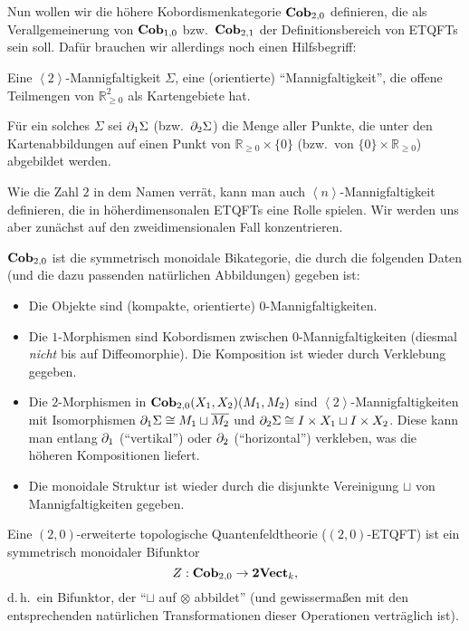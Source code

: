 
Nun wollen wir die h\"ohere Kobordismenkategorie $\mathbf{Cob}_{2, 0}$
definieren, die als Verallgemeinerung von $\mathbf{Cob}_{1, 0}$ bzw.\
$\mathbf{Cob}_{2, 1}$ der Definitionsbereich von ETQFTs sein soll. Daf\"ur
brauchen wir allerdings noch einen Hilfsbegriff:

\begin{Def}
Eine $\left<2\right>$-Mannigfaltigkeit $\Sigma$, eine (orientierte)
"`Mannigfaltigkeit"', die offene Teilmengen von $\mathbb{R}_{\geq 0}^2$ als
Kartengebiete hat.

F\"ur ein solches $\Sigma$ sei $\partial_1 \Sigma$ (bzw.\ $\partial_2 \Sigma$) die
Menge aller Punkte, die unter den Kartenabbildungen auf einen Punkt von
$\mathbb{R}_{\geq 0} \times \{0\}$ (bzw.\ von $\{0\} \times
\mathbb{R}_{\geq 0}$) abgebildet werden.
\end{Def}

Wie die Zahl $2$ in dem Namen verr\"at, kann man auch
$\left<n\right>$-Mannigfaltigkeit definieren, die in h\"oherdimensonalen ETQFTs
eine Rolle spielen. Wir werden uns aber zun\"achst auf den zweidimensionalen
Fall konzentrieren.

\begin{Def}
$\mathbf{Cob}_{2, 0}$ ist die symmetrisch monoidale Bikategorie, die durch
die folgenden Daten (und die dazu passenden nat\"urlichen Abbildungen) gegeben
ist:
\begin{itemize}
\item Die Objekte sind (kompakte, orientierte) $0$-Mannigfaltigkeiten.
\item Die $1$-Morphismen sind Kobordismen zwischen $0$-Mannigfaltigkeiten
(diesmal \emph{nicht} bis auf Diffeomorphie). Die Komposition ist wieder durch
Verklebung gegeben.
\item Die $2$-Morphismen in $\mathbf{Cob}_{2, 0} (X_1, X_2) (M_1, M_2)$ sind
$\left<2\right>$-Mannigfaltigkeiten mit Isomorphismen $\partial_1 \Sigma \cong M_1
\sqcup \overline{M_2}$ und $\partial_2 \Sigma \cong I \times X_1 \sqcup I \times
X_2$. Diese kann man entlang $\partial_1$ ("`vertikal"') oder $\partial_2$
("`horizontal"') verkleben, was die h\"oheren Kompositionen liefert.
\item Die monoidale Struktur ist wieder durch die disjunkte Vereinigung
$\sqcup$ von Mannigfaltigkeiten gegeben.
\end{itemize}
\end{Def}

\begin{Def}
Eine $(2, 0)$-erweiterte topologische Quantenfeldtheorie ($(2, 0)$-ETQFT) ist
ein symmetrisch monoidaler Bifunktor
\begin{equation}
Z: \mathbf{Cob}_{2, 0} \to \mathbf{2Vect}_k, \nonumber
\end{equation}
d.\,h.\ ein Bifunktor, der "`$\sqcup$ auf $\otimes$ abbildet"' (und
gewisserma\ss en mit den entsprechenden nat\"urlichen Transformationen dieser
Operationen vertr\"aglich ist).
\end{Def}

